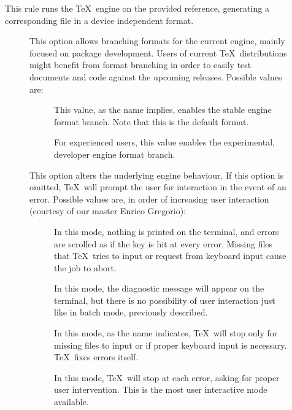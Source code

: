 \begin{description}
\item[]
This rule runs the  \TeX\ engine on the provided  reference, generating a corresponding file in a device independent format.

\begin{description}
\item[] This option allows branching formats for the current engine, mainly focused on package development. Users of current \TeX\ distributions might benefit from format branching in order to easily test documents and code against the upcoming releases. Possible values are:

\begin{description}
\item[] This value, as the name implies, enables the stable engine format branch. Note that this is the default format.

\item[] For experienced users, this value enables the experimental, developer engine format branch.
\end{description}

\item[] This option alters the underlying engine behaviour. If this option is omitted, \TeX\ will prompt the user for interaction in the event of an error. Possible values are, in order of increasing user interaction (courtesy of our master Enrico Gregorio):

\begin{description}
\item[] In this mode, nothing is printed on the terminal, and errors are scrolled as if the  key is hit at every error. Missing files that \TeX\ tries to input or request from keyboard input cause the job to abort.

\item[] In this mode, the diagnostic message will appear on the terminal, but there is no possibility of user interaction just like in batch mode, previously described.

\item[] In this mode, as the name indicates, \TeX\ will stop only for missing files to input or if proper keyboard input is necessary. \TeX\ fixes errors itself.

\item[] In this mode, \TeX\ will stop at each error, asking for proper user intervention. This is the most user interactive mode available.
\end{description}


\end{description}
\end{description}
